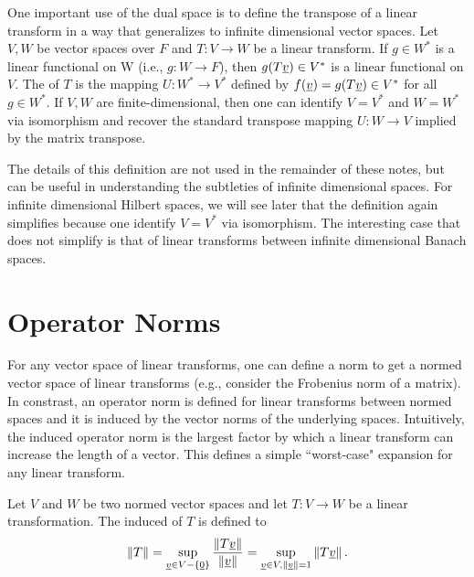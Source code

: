 One important use of the dual space is to define the transpose of a linear transform in a way that generalizes to infinite dimensional vector spaces.
Let $V,W$ be vector spaces over $F$ and $T \colon V \rightarrow W$ be a linear transform.
If $g \in W^*$ is a linear functional on W (i.e., $g \colon W \rightarrow F$), then $g(T\underline{v})\in V^*$ is a linear functional on $V$.
The  of $T$ is the mapping $U \colon W^* \rightarrow V^*$ defined by $f(\underline{v})=g(T\underline{v})\in V^*$ for all $g\in W^*$.
If $V,W$ are finite-dimensional, then one can identify $V=V^*$ and $W=W^*$ via isomorphism and recover the standard transpose mapping $U \colon W \rightarrow V$ implied by the matrix transpose.

The details of this definition are not used in the remainder of these notes, but can be useful in understanding the subtleties of infinite dimensional spaces.
For infinite dimensional Hilbert spaces, we will see later that the definition again simplifies because one identify $V=V^*$ via isomorphism.
The interesting case that does not simplify is that of linear transforms between infinite dimensional Banach spaces.
 


\section{Operator Norms}

For any vector space of linear transforms, one can define a norm to get a normed vector space of linear transforms (e.g., consider the Frobenius norm of a matrix).
In constrast, an operator norm is defined for linear transforms between normed spaces and it is induced by the vector norms of the underlying spaces.
Intuitively, the induced operator norm is the largest factor by which a linear transform can increase the length of a vector.
This defines a simple ``worst-case" expansion for any linear transform.

\begin{definition}
Let $V$ and $W$ be two normed vector spaces and let $T \colon V \rightarrow W$ be a linear transformation.
The induced  of $T$ is defined to
\begin{equation*}
\left\| T \right\|
= \sup_{ \underline{v} \in V - \left\{ \underline{0} \right\} }
\frac{ \left\| T \underline{v} \right\| }{ \left\| \underline{v} \right\| }
= \sup_{\underline{v} \in V, \left\| \underline{v} \right\| = 1 }
\left\| T \underline{v} \right\| .
\end{equation*}
\end{definition}

